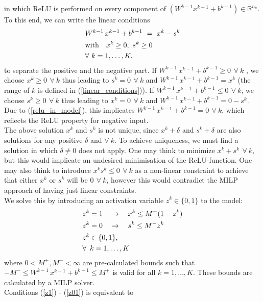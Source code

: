 \documentclass{article}
\begin{document}
in which ReLU is performed on every component of $(W^{k-1} x^{k-1} + b^{k-1}) \in \mathbb{R}^{n_k}$.
To this end, we can write the linear conditions
\begin{align} \label{linear_conditions}
&W^{k-1} \, x^{k-1} + b^{k-1} \ = \ x^{k} - s^k  \\
&\text{with} \quad x^k \geq 0, \ s^k \geq 0 \notag \\
&\forall \ k=1, \ldots, K \notag .
\end{align}
to separate the positive and the negative part.
If $W^{k-1} \, x^{k-1} + b^{k-1} \geq 0 \ \, \forall \ k$ , we choose $x^k \geq 0 \ \, \forall \ k$ thus leading to $s^k=0 \ \, \forall \ k$ and $W^{k-1} \, x^{k-1} + b^{k-1} = x^k$ (the range of $k$ is defined in (\ref{linear_conditions})).
If $W^{k-1} \, x^{k-1} + b^{k-1} \leq 0 \ \, \forall \ k$, we choose $s^k \geq 0 \ \, \forall \ k$ thus leading to $x^k=0 \ \, \forall \ k$ and $W^{k-1} \, x^{k-1} + b^{k-1} = 0 - s^k$. Due to (\ref{relu_in_model}), this implicates $W^{k-1} \, x^{k-1} + b^{k-1} = 0 \ \, \forall \ k$, which reflects the ReLU property for negative input.\\
The above solution $x^k$ and $s^k$ is not unique, since $x^k+\delta$ and $s^k+\delta$ are also solutions for any positive $\delta$ and $\forall \ k$. To achieve uniqueness, we must find a solution in which $\delta\neq0$ does not apply.
One may think to minimize $x^k+s^k \ \, \forall \ k$, but this would implicate an undesired minimisation of the ReLU-function. One may also think to introduce $x^k s^k \leq 0 \ \, \forall \ k$ as a non-linear constraint to achieve that either $x^k$ or $s^k$ will be $0 \ \, \forall \ k$, however this would contradict the MILP approach of having just linear constraints.\\
We solve this by introducing an activation variable $z^k \in \{ 0,1 \}$ to the model:
\begin{align}
&z^k = 1 \quad \rightarrow \quad x^k \leq M^{+}(1-z^k) \label{z1}\\
&z^k = 0 \quad \rightarrow \quad s^k \leq M^{-}z^k \label{z0}\\
&z^k \in \{0,1\}, \label{z01}\\
& \forall \ \, k=1, \ldots, K \notag
\end{align}
where $ 0 < M^+,M^- < \infty$ are pre-calculated bounds such that $-M^- \leq W^{k-1} \, x^{k-1} + b^{k-1} \leq M^+$ is valid for all $k = 1, \ldots, K$. These bounds are calculated by a MILP solver.\\
Conditions (\ref{z1}) - (\ref{z01}) is equivalent to
\end{document}
